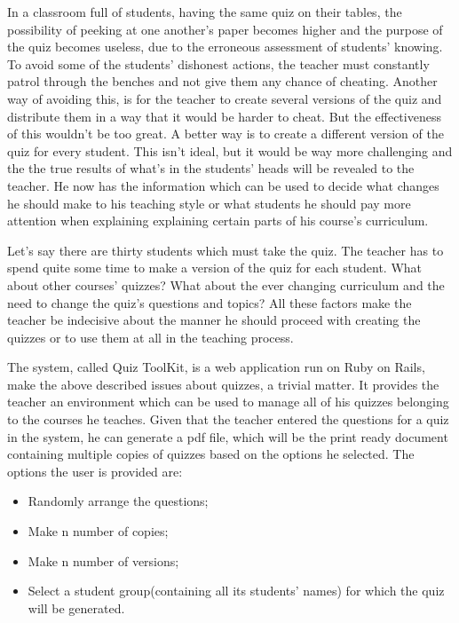 In a classroom full of students, having the same quiz on their tables, the possibility of peeking at one another’s paper becomes higher and the purpose of the quiz becomes useless, due to the erroneous assessment of students’ knowing. To avoid some of the students’ dishonest actions, the teacher must constantly patrol through the benches and not give them any chance of cheating. Another way of avoiding this, is for the teacher to create several versions of the quiz and distribute them in a way that it would be harder to cheat. But the effectiveness of this wouldn’t be too great. A better way is to create a different version of the quiz for every student. This isn’t ideal, but it would be way more challenging and the the true results of what’s in the students’ heads will be revealed to the teacher. He now has the information which can be used to decide what changes he should make to his teaching style or what students he should pay more attention when explaining  explaining certain parts of his course’s curriculum. 

Let’s say there are thirty students which must take the quiz. The teacher has to spend quite some time to make a version of the quiz for each student. What about other courses’ quizzes? What about the ever changing curriculum and the need to change the quiz’s questions and topics? All these factors make the teacher be indecisive about the manner he should proceed with creating the quizzes or to use them at all in the teaching process. 



The system, called Quiz ToolKit, is a web application run on Ruby on Rails, make the above described issues about quizzes, a trivial matter. It provides the teacher an environment which can be used to manage all of his quizzes belonging to the courses he teaches. Given that the teacher entered the questions for a quiz in the system, he can generate a pdf file, which will be the print ready document containing multiple copies of quizzes based on the options he selected. The options the user is provided are: 

\begin{itemize}
  \item Randomly arrange the questions;
  \item Make n number of copies;
  \item Make n number of versions;
  \item Select a student group(containing all its students’ names) for which the quiz will be generated.    
\end{itemize}

